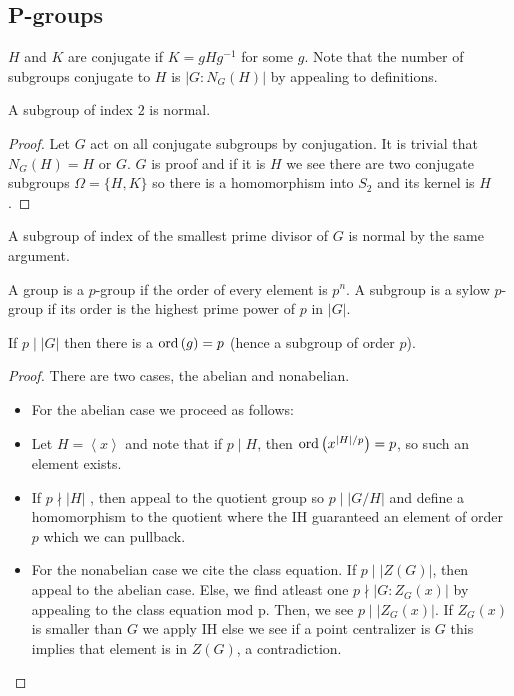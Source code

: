 \subsection{P-groups}
\begin{definition}
	\(H\) and \(K\) are conjugate if \(K = gHg^{-1}\) for some \(g\). Note that the number of subgroups conjugate to \(H\) is \(\left| G : N_{G}\left( H \right)  \right| \) by appealing to definitions.
\end{definition}
\begin{theorem}
	A subgroup of index \(2\) is normal.
\end{theorem}
\begin{proof}
	Let \(G\) act on all conjugate subgroups by conjugation. It is trivial that \(N_{G}\left( H \right)  = H\)  or \(G\). \(G\) is proof and if it is \(H\) we see there are two conjugate subgroups \(\Omega = \{H, K\} \)  so there is a homomorphism into \(S_2\) and its kernel is \(H\).
\end{proof}
\begin{remark}
A subgroup of index of the smallest prime divisor of \(G\) is normal by the same argument.
\end{remark}
\begin{definition}
	A group is a \(p\)-group if the order of every element is \(p^{n}\). A subgroup is a sylow \(p\)-group if its order is the highest prime power of \(p\)  in \(\left| G \right| \).
\end{definition}
\begin{theorem}
	If \(p \mid \left| G \right| \) 	then there is a \(\operatorname{ord} \left( g \right)  = p\) (hence a subgroup of order \(p\)).
\end{theorem}
\begin{proof}
	There are two cases, the abelian and nonabelian.
	\begin{itemize}
		\item For the abelian case we proceed as follows:
		\item Let \(H = \left<x \right> \) and note  that if \(p \mid H\), then \(\operatorname{ord} \left( x^{\left| H \right|/p} \right) = p \), so such an element exists.
\item If \(p \nmid \left| H \right| \) , then appeal to the quotient group so \(p \mid \left| G / H \right| \) and define a homomorphism to the quotient where the IH guaranteed an element of order \(p\) which we can pullback.
\item For the nonabelian case we cite the class equation. If \(p \mid \left| Z\left( G \right)  \right| \), then appeal to the abelian case. Else, we find atleast one \(p \nmid \left| G : Z_{G}\left( x \right)  \right| \) by appealing to the class equation mod p. Then, we see \(p \mid \left| Z_{G}\left( x \right)  \right| \). If \(Z_{G}\left( x \right) \) is smaller than \(G\) we apply IH else we see if a point centralizer is \(G\) this implies that element is in \(Z\left( G \right) \), a contradiction.
	\end{itemize}
\end{proof}
